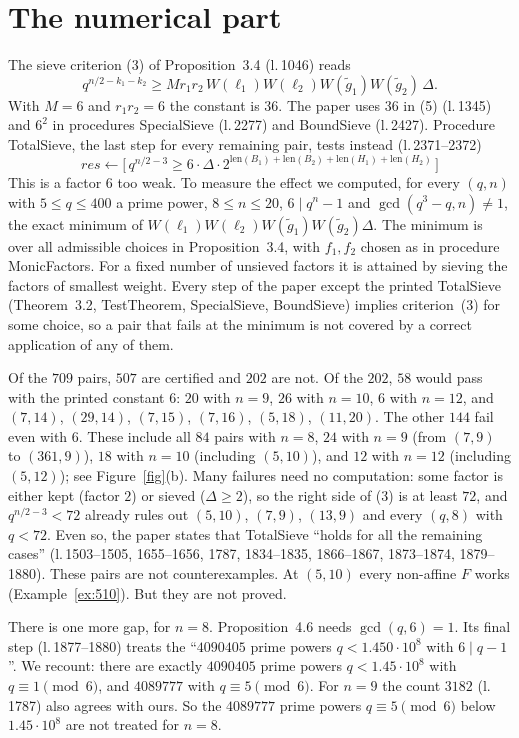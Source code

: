 \documentclass[11pt,a4paper]{amsart}
\theoremstyle{remark}
\begin{document}
\section{The numerical part}\label{sec:num}

The sieve criterion (3) of Proposition~3.4 (l.\,1046) reads
\[
q^{n/2-k_1-k_2}\ge Mr_1r_2\,W(\ell_1)W(\ell_2)W(\tilde g_1)W(\tilde g_2)\,\Delta .
\]
With $M=6$ and $r_1r_2=6$ the constant is $36$. The paper uses $36$ in (5) (l.\,1345) and $6^2$ in procedures SpecialSieve
(l.\,2277) and BoundSieve (l.\,2427). Procedure TotalSieve, the last step for every remaining pair, tests instead
(l.\,2371--2372)
\[
\mathit{res}\gets\bigl[\,q^{n/2-3}\ge 6\cdot\Delta\cdot 2^{\mathrm{len}(B_1)+\mathrm{len}(B_2)+\mathrm{len}(H_1)+\mathrm{len}(H_2)}\,\bigr]
\]
This is a factor $6$ too weak. To measure the effect we computed, for every $(q,n)$ with $5\le q\le400$ a prime power,
$8\le n\le20$, $6\mid q^n-1$ and $\gcd(q^3-q,n)\ne1$, the exact minimum of
$W(\ell_1)W(\ell_2)W(\tilde g_1)W(\tilde g_2)\Delta$. The minimum is over all admissible choices in Proposition~3.4,
with $f_1,f_2$ chosen as in procedure MonicFactors. For a fixed number of unsieved factors it is attained by sieving
the factors of smallest weight. Every step of the paper except the printed TotalSieve (Theorem~3.2, TestTheorem, SpecialSieve, BoundSieve)
implies criterion~(3) for some choice, so a pair that fails at the minimum is not covered by a correct application
of any of them.

Of the $709$ pairs, $507$ are certified and $202$ are not. Of the $202$, $58$ would pass with the printed constant $6$:
$20$ with $n=9$, $26$ with $n=10$, $6$ with $n=12$, and $(7,14)$, $(29,14)$, $(7,15)$, $(7,16)$, $(5,18)$, $(11,20)$.
The other $144$ fail even with $6$. These include all $84$ pairs with $n=8$, $24$ with $n=9$ (from $(7,9)$ to
$(361,9)$), $18$ with $n=10$ (including $(5,10)$), and $12$ with $n=12$ (including $(5,12)$); see
Figure~\ref{fig}(b). Many failures need no computation: some factor is either kept (factor $2$) or sieved
($\Delta\ge2$), so the right side of (3) is at least $72$, and $q^{n/2-3}<72$ already rules out $(5,10)$, $(7,9)$, $(13,9)$ and every $(q,8)$
with $q<72$. Even so, the paper states that TotalSieve ``holds for all the remaining cases''
(l.\,1503--1505, 1655--1656, 1787, 1834--1835, 1866--1867, 1873--1874, 1879--1880). These pairs are not counterexamples. At $(5,10)$ every non-affine $F$
works (Example~\ref{ex:510}). But they are not proved.

There is one more gap, for $n=8$. Proposition~4.6 needs $\gcd(q,6)=1$. Its final step (l.\,1877--1880) treats the
``$4090405$ prime powers $q<1.450\cdot10^8$ with $6\mid q-1$''. We recount: there are exactly $4090405$ prime powers
$q<1.45\cdot10^8$ with $q\equiv1\pmod 6$, and $4089777$ with $q\equiv5\pmod 6$. For $n=9$ the count $3182$ (l.\,1787)
also agrees with ours. So the $4089777$ prime powers $q\equiv5\pmod6$ below $1.45\cdot10^8$ are not treated for
$n=8$.
\end{document}
